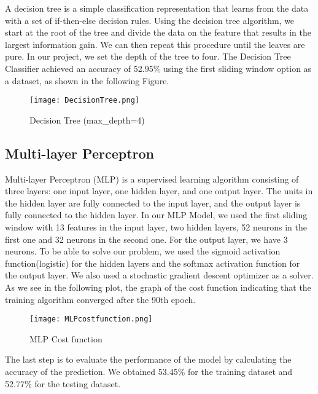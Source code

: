 A decision tree is a simple classification representation that learns from the data with a set of if-then-else decision rules.\newline \newline
Using the decision tree algorithm, we start at the root of the tree and divide the data on the feature that results in the largest information gain. We can then repeat this procedure until the leaves are pure.\newline \newline
In our project, we set the depth of the tree to four.\newline
The Decision Tree Classifier achieved an accuracy of 52.95\% using the first sliding window option as a dataset, as shown in the following Figure.
\begin{figure}[H]
\begin{center}
\texttt{[image: DecisionTree.png]}
\end{center}
\caption{Decision Tree (max\_depth=4)}
\label{fig:DecisionTree}
\end{figure}


\subsection{Multi-layer Perceptron}

Multi-layer Perceptron (MLP) is a supervised learning algorithm consisting of three layers: one input layer, one hidden layer, and one output layer. The units in the hidden layer are fully connected to the input layer, and the output layer is fully connected to the hidden layer.\newline \newline %
In our MLP Model, we used the first sliding window with 13 features in the input layer, two hidden layers, 52 neurons in the first one and 32 neurons in the second one. For the output layer, we have 3 neurons.\newline \newline  
To be able to solve our problem, we used the sigmoid activation function(logistic) for the hidden layers and the softmax activation function for the output layer. We also used a stochastic gradient descent optimizer as a solver. \newline 
As we see in the following plot, the graph of the cost function indicating that the training algorithm converged after the 90th epoch. \newline
\begin{figure}[H]
\begin{center}
\texttt{[image: MLPcostfunction.png]}
\end{center}
\caption{MLP Cost function}
\label{fig:MLPcostfunction}
\end{figure}
The last step is to evaluate the performance of the model by calculating the accuracy of the prediction. We obtained 53.45\% for the training dataset and 52.77\% for the testing dataset.

